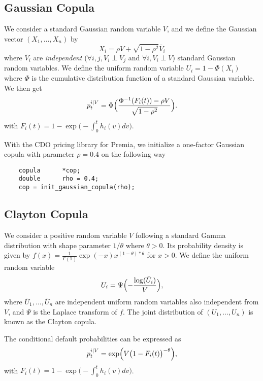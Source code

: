 \documentclass[10pt, a4paper]{article}
\begin{document}
\subsection{Gaussian Copula}
We consider a standard Gaussian random variable $V$, and we define the Gaussian vector $(X_1, \dots, X_n)$ 
by 
\begin{equation*}
    X_i = \rho V + \sqrt{1 - \rho^2} \bar{V}_i
\end{equation*}
where $\bar{V}_i$ are \emph{independent} ($\forall i, j, V_i \perp V_j$ and $\forall i, V_i \perp V$) standard Gaussian random variables. We define the uniform random variable $U_i = 1 - \Phi(X_i)$ where $\Phi$ is the cumulative distribution function of a standard Gaussian variable. We then get 
\begin{equation*}
    p^{i|V}_t = \Phi \Bigl( \frac{\Phi^{-1}(F_i(t)) - \rho V}{\sqrt{1-\rho^2}} \Bigr).
\end{equation*}
with $F_i(t) = 1 - \exp \bigl( - \int_0^t h_i(v) d v \bigr)$.

With the CDO pricing library for Premia, we initialize a one-factor Gaussian copula with parameter $\rho = 0.4$ on the following way 
\begin{lstlisting}
    copula      *cop;
    double      rho = 0.4;
    cop = init_gaussian_copula(rho);
\end{lstlisting}

\subsection{Clayton Copula}
We consider a positive random variable $V$ following a standard Gamma distribution with shape parameter $1/\theta$ where $\theta > 0$. Its probability density is given by $f(x) = \frac{1}{\Gamma(1)} \exp(-x) x^{(1-\theta)*\theta}$ for $x > 0$. We define the uniform random variable 
\begin{equation*}
    U_i = \Psi \Bigl( - \frac{\log(\bar{U}_i)}{V} \Bigr),
\end{equation*}
where $\bar{U}_1,\dots,\bar{U}_n$ are independent uniform random variables also independent from $V$, and $\Psi$ is the Laplace transform of $f$. The joint distribution of $(U_1,\dots,U_n)$ is known as the Clayton copula. 

The conditional default probabilities can be expressed as 
\begin{equation*}
    p^{i|V}_t = \exp\Bigl( V \bigl(1 - F_i(t)\bigr)^{- \theta} \Bigr), 
\end{equation*}
with $F_i(t) = 1 - \exp \bigl( - \int_0^t h_i(v) d v \bigr)$.
\end{document}
